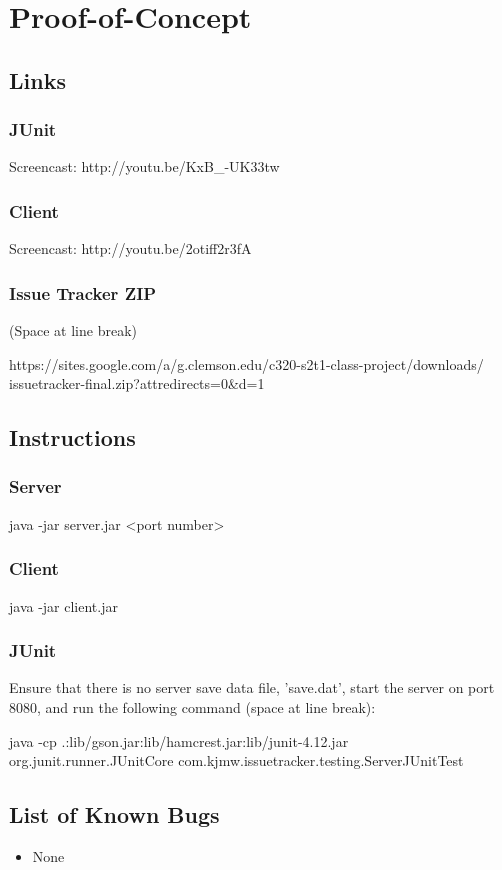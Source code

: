 \chapter{Proof-of-Concept}

\section{Links}

\subsection{JUnit}
Screencast: http://youtu.be/KxB\_-UK33tw

\subsection{Client}
Screencast: http://youtu.be/2otiff2r3fA

\subsection{Issue Tracker ZIP}

(Space at line break)

https://sites.google.com/a/g.clemson.edu/c320-s2t1-class-project/downloads/\ \\ \indent issuetracker-final.zip?attredirects=0\&d=1

\section{Instructions}

\subsection{Server}

java -jar server.jar <port number>

\subsection{Client}

java -jar client.jar

\subsection{JUnit}

Ensure that there is no server save data file, 'save.dat', start the server on port 8080, and run the following command (space at line break):

\vspace{10pt}

java -cp .:lib/gson.jar:lib/hamcrest.jar:lib/junit-4.12.jar\ \\ \indent \indent org.junit.runner.JUnitCore com.kjmw.issuetracker.testing.ServerJUnitTest

\section{List of Known Bugs}

\begin{itemize}
	\item None
\end{itemize}
